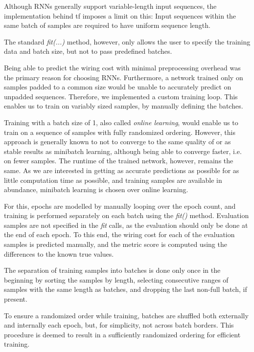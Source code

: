 Although \glspl{RNN} generally support variable-length input sequences, the implementation behind \gls{tf} imposes a limit on this: Input sequences within the same batch of samples are required to have uniform sequence length.

The standard \textit{fit(...)} method, however, only allows the user to specify the training data and batch size, but not to pass predefined batches.

Being able to predict the wiring cost with minimal preprocessing overhead was the primary reason for choosing \glspl{RNN}. Furthermore, a network trained only on samples padded to a common size would be unable to accurately predict on unpadded sequences. Therefore, we implemented a custom training loop. This enables us to train on variably sized samples, by manually defining the batches.

Training with a batch size of 1, also called \textit{online learning}, would enable us to train on a sequence of samples with fully randomized ordering. However, this approach is generally known to not to converge to the same quality of or as stable results as minibatch learning, although being able to converge faster, i.e. on fewer samples. The runtime of the trained network, however, remains the same. As we are interested in getting as accurate predictions as possible for as little computation time as possible, and training samples are available in abundance, minibatch learning is chosen over online learning.

For this, epochs are modelled by manually looping over the epoch count, and training is performed separately on each batch using the \textit{fit()} method. Evaluation samples are not specified in the \textit{fit} calls, as the evaluation should only be done at the end of each epoch. To this end, the wiring cost for each of the evaluation samples is predicted manually, and the metric score is computed using the differences to the known true values.

The separation of training samples into batches is done only once in the beginning by sorting the samples by length, selecting consecutive ranges of samples with the same length as batches, and dropping the last non-full batch, if present.

To ensure a randomized order while training, batches are shuffled both externally and internally each epoch, but, for simplicity, not across batch borders. This procedure is deemed to result in a sufficiently randomized ordering for efficient training.


